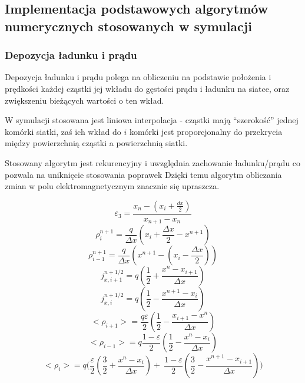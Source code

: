     \subsection{Implementacja podstawowych algorytmów numerycznych stosowanych w symulacji}
    \subsubsection{Depozycja ładunku i prądu}

    Depozycja ładunku i prądu polega na obliczeniu na podstawie położenia i prędkości każdej cząstki jej wkładu do
    gęstości prądu i ładunku na siatce, oraz zwiększeniu bieżących wartości o ten wkład.

    W symulacji stosowana jest liniowa interpolacja - cząstki mają ``szerokość'' jednej komórki siatki, zaś ich wkład do $i$
    komórki jest proporcjonalny do przekrycia między powierzchnią cząstki a powierzchnią siatki.

    Stosowany algorytm jest rekurencyjny i uwzględnia zachowanie ładunku/prądu %
    co pozwala na uniknięcie stosowania poprawek %
    Dzięki temu algorytm obliczania zmian w polu elektromagnetycznym znacznie się upraszcza.


    \begin{equation}
        \varepsilon_3 = \frac{x_n - (x_i + \frac{dx}{2})}{x_{n+1} - x_n}
    \end{equation}
    \begin{equation}
        \rho_i^{n+1} = \frac{q}{\Delta x} (x_i + \frac{\Delta x}{2} - x^{n+1})
    \end{equation}
    \begin{equation}
        \rho_{i-1}^{n+1} = \frac{q}{\Delta x} (x^{n+1} - (x_i - \frac{\Delta x}{2}))
    \end{equation}
    \begin{equation}
        j_{x,i+1}^{n+1/2} = q (\frac{1}{2} + \frac{x^n - x_{i+1}}{\Delta x})
    \end{equation}
    \begin{equation}
        j_{x,i}^{n+1/2} = q (\frac{1}{2} - \frac{x^{n+1} - x_i}{\Delta x})
    \end{equation}
    \begin{equation}
        <\rho_{i+1}> = \frac{q \varepsilon}{2} (\frac{1}{2} - \frac{x_{i+1} - x^n}{\Delta x})
    \end{equation}
    \begin{equation}
        <\rho_{i-1}> = q \frac{1- \varepsilon}{2} (\frac{1}{2} - \frac{x^n - x_i}{\Delta x})
    \end{equation}
    \begin{equation}
        <\rho_{i}> = q \Bigg(\frac{\varepsilon}{2} (\frac{3}{2} + \frac{x^n-x_i}{\Delta x}) +\
        \frac{1-\varepsilon}{2} (\frac{3}{2} - \frac{x^{n+1} - x_{i+1}}{\Delta x})\Bigg)
    \end{equation}

